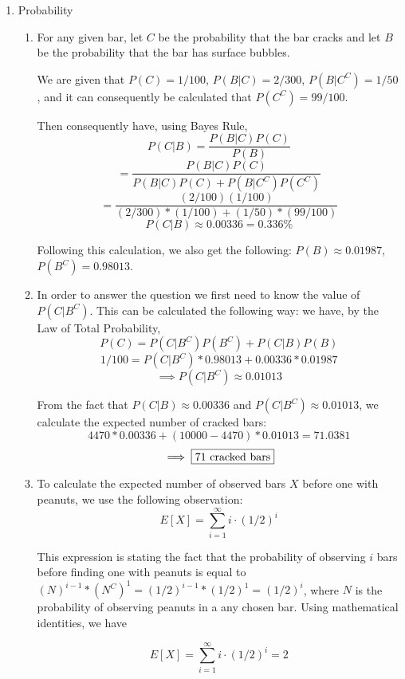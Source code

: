 \documentclass[submit]{harvardml}
\begin{document}
\renewcommand{\labelenumii}{\arabic{enumi}.\arabic{enumii}}
\renewcommand{\labelenumiii}{(\alph{enumiii})}

  \begin{enumerate}
    \item Probability
    \begin{enumerate}
      \item
      For any given bar, let $C$ be the probability that the bar cracks and let $B$ be the
      probability that the bar has surface bubbles. 

      We are given that $P(C) = 1/100$, $P(B|C) = 2/300$, $P(B|C^C) = 1/50$, and it can consequently
      be calculated that $P(C^C) = 99/100$.
      
      Then consequently have, using Bayes Rule,
      $$P(C|B) = \frac{P(B|C)P(C)}{P(B)}$$
      $$=\frac{P(B|C)P(C)}{P(B|C)P(C) + P(B|C^C)P(C^C)}$$
      $$=\frac{(2/100)(1/100)}{(2/300)*(1/100) + (1/50)*(99/100)}$$
      $$\boxed{P(C|B) \approx 0.00336 = 0.336\%}$$

      Following this calculation, we also get the following: $P(B)\approx 0.01987$, $P(B^C) =
      0.98013$.

      \item 
      In order to answer the question we first need to know the value of $P(C|B^C)$. This can be
      calculated the following way: we have, by the Law of Total Probability,
      $$P(C) = P(C|B^C)P(B^C) + P(C|B)P(B)$$
      $$1/100 = P(C|B^C)*0.98013 + 0.00336*0.01987$$
      $$\implies P(C|B^C) \approx 0.01013$$

      From the fact that $P(C|B) \approx  0.00336$ and $P(C|B^C) \approx 0.01013$, we calculate the
      expected number of cracked bars:
      $$4470*0.00336 + (10000-4470)*0.01013 = 71.0381$$
      $$\implies \boxed{71 \textnormal{ cracked bars}}$$

      \item 
      To calculate the expected number of observed bars $X$ before one with peanuts, we use the
      following observation:
      $$E[X] = \sum_{i=1}^\infty i \cdot (1/2)^i$$

      This expression is stating the fact that the probability of observing $i$ bars before finding
      one with peanuts is equal to $(N)^{i-1} * (N^C)^{1} = (1/2)^{i-1} * (1/2)^1 = (1/2)^i$, where
      $N$ is the probability of observing peanuts in a any chosen bar. Using mathematical
      identities, we have

      $$\boxed{E[X] = \sum_{i=1}^\infty i \cdot (1/2)^i = 2}$$


\end{enumerate}
\end{enumerate}
\end{document}
